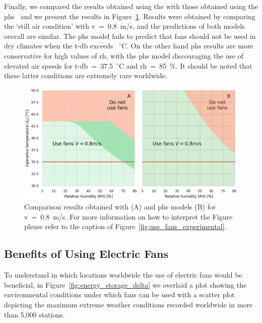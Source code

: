 Finally, we compared the results obtained using the  with those obtained using the \ac{phs}~\cite{iso7933} and we present the results in Figure~\ref{fig:gagge_phs}.
Results were obtained by comparing the `still air condition' with \ac{v}~=~0.8~m/s, and the predictions of both models overall are similar.
The \ac{phs} model fails to predict that fans should not be used in dry climates when the \ac{t-db} exceeds ~$^{\circ}$C\@.
On the other hand \ac{phs} results are more conservative for high values of \ac{rh}, with the \ac{phs} model discouraging the use of elevated air speeds for \ac{t-db}~=~37.5~$^{\circ}$C and \ac{rh}~=~85~\%\@.
It should be noted that these latter conditions are extremely rare worldwide.

\begin{figure}[hbt!]
    \centering
    \includegraphics[width=\textwidth]{figures/phs_gagge}
    \caption{Comparison results obtained with  (A) and \ac{phs} models (B) for \ac{v}~=~0.8~m/s.
    For more information on how to interpret the Figure please refer to the caption of Figure~\ref{fig:use_fans_experimental}.}
    \label{fig:gagge_phs}
\end{figure}

\subsection{Benefits of Using Electric Fans}\label{subsec:use-fans}

To understand in which locations worldwide the use of electric fans would be beneficial, in Figure~\ref{fig:energy_storage_delta} we overlaid a plot showing the environmental conditions under which fans can be used with a scatter plot depicting the maximum extreme weather conditions recorded worldwide in more than 5,000 stations.

